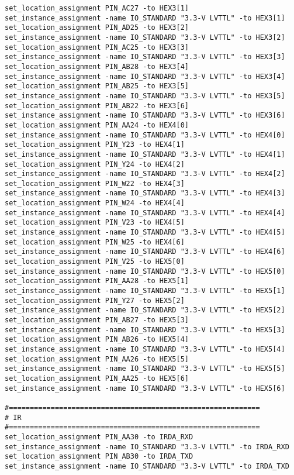 \begin{verbatim}
set_location_assignment PIN_AC27 -to HEX3[1]
set_instance_assignment -name IO_STANDARD "3.3-V LVTTL" -to HEX3[1]
set_location_assignment PIN_AD25 -to HEX3[2]
set_instance_assignment -name IO_STANDARD "3.3-V LVTTL" -to HEX3[2]
set_location_assignment PIN_AC25 -to HEX3[3]
set_instance_assignment -name IO_STANDARD "3.3-V LVTTL" -to HEX3[3]
set_location_assignment PIN_AB28 -to HEX3[4]
set_instance_assignment -name IO_STANDARD "3.3-V LVTTL" -to HEX3[4]
set_location_assignment PIN_AB25 -to HEX3[5]
set_instance_assignment -name IO_STANDARD "3.3-V LVTTL" -to HEX3[5]
set_location_assignment PIN_AB22 -to HEX3[6]
set_instance_assignment -name IO_STANDARD "3.3-V LVTTL" -to HEX3[6]
set_location_assignment PIN_AA24 -to HEX4[0]
set_instance_assignment -name IO_STANDARD "3.3-V LVTTL" -to HEX4[0]
set_location_assignment PIN_Y23 -to HEX4[1]
set_instance_assignment -name IO_STANDARD "3.3-V LVTTL" -to HEX4[1]
set_location_assignment PIN_Y24 -to HEX4[2]
set_instance_assignment -name IO_STANDARD "3.3-V LVTTL" -to HEX4[2]
set_location_assignment PIN_W22 -to HEX4[3]
set_instance_assignment -name IO_STANDARD "3.3-V LVTTL" -to HEX4[3]
set_location_assignment PIN_W24 -to HEX4[4]
set_instance_assignment -name IO_STANDARD "3.3-V LVTTL" -to HEX4[4]
set_location_assignment PIN_V23 -to HEX4[5]
set_instance_assignment -name IO_STANDARD "3.3-V LVTTL" -to HEX4[5]
set_location_assignment PIN_W25 -to HEX4[6]
set_instance_assignment -name IO_STANDARD "3.3-V LVTTL" -to HEX4[6]
set_location_assignment PIN_V25 -to HEX5[0]
set_instance_assignment -name IO_STANDARD "3.3-V LVTTL" -to HEX5[0]
set_location_assignment PIN_AA28 -to HEX5[1]
set_instance_assignment -name IO_STANDARD "3.3-V LVTTL" -to HEX5[1]
set_location_assignment PIN_Y27 -to HEX5[2]
set_instance_assignment -name IO_STANDARD "3.3-V LVTTL" -to HEX5[2]
set_location_assignment PIN_AB27 -to HEX5[3]
set_instance_assignment -name IO_STANDARD "3.3-V LVTTL" -to HEX5[3]
set_location_assignment PIN_AB26 -to HEX5[4]
set_instance_assignment -name IO_STANDARD "3.3-V LVTTL" -to HEX5[4]
set_location_assignment PIN_AA26 -to HEX5[5]
set_instance_assignment -name IO_STANDARD "3.3-V LVTTL" -to HEX5[5]
set_location_assignment PIN_AA25 -to HEX5[6]
set_instance_assignment -name IO_STANDARD "3.3-V LVTTL" -to HEX5[6]

#============================================================
# IR
#============================================================
set_location_assignment PIN_AA30 -to IRDA_RXD
set_instance_assignment -name IO_STANDARD "3.3-V LVTTL" -to IRDA_RXD
set_location_assignment PIN_AB30 -to IRDA_TXD
set_instance_assignment -name IO_STANDARD "3.3-V LVTTL" -to IRDA_TXD


\end{verbatim}
